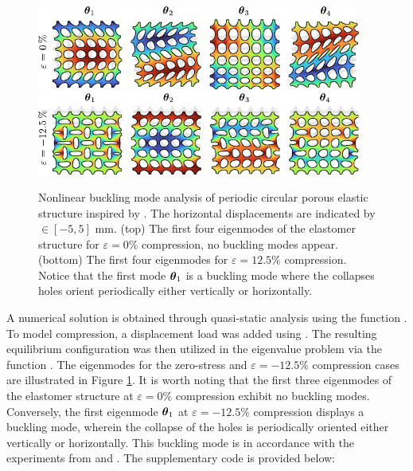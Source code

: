 \begin{example}
\begin{figure}[!t]
    \centering
\includegraphics*[width=0.95\textwidth]{./pdf/thesis-figure-6-6-1.pdf} \\[0.5em]
\includegraphics*[width=0.95\textwidth]{./pdf/thesis-figure-6-6-2.pdf}
%
\caption{Nonlinear buckling mode analysis of periodic circular porous elastic structure inspired by \cite{Bertoldi2008,Overvelde2012May}. The horizontal displacements are indicated by \protect{}$\!\!\in [-5,5]$ \si{\milli \meter}. (top) The first four eigenmodes of the elastomer structure for $\varepsilon = 0\%$ compression, no buckling modes appear. (bottom)  The first four eigenmodes for $\varepsilon = 12.5\%$ compression. Notice that the first mode ${\boldsymbol{\theta}}_1$ is a buckling mode where the collapses holes orient periodically either vertically or horizontally. }
\label{fig:C5:fig_bucklemode}
\vspace{-3mm}
\end{figure}

A numerical solution is obtained through quasi-static analysis using the function . To model compression, a displacement load was added using . The resulting equilibrium configuration was then utilized in the eigenvalue problem via the function . The eigenmodes for the zero-stress and $\varepsilon = -12.5\%$ compression cases are illustrated in Figure \ref{fig:C5:fig_bucklemode}. It is worth noting that the first three eigenmodes of the elastomer structure at $\varepsilon = 0\%$ compression exhibit no buckling modes. Conversely, the first eigenmode ${\boldsymbol{\theta}}_1$ at $\varepsilon = -12.5\%$ compression displays a buckling mode, wherein the collapse of the holes is periodically oriented either vertically or horizontally. This buckling mode is in accordance with the experiments from \cite{Overvelde2012May} and \cite{Bertoldi2008}. The supplementary code is provided below: 
\end{example}
%


